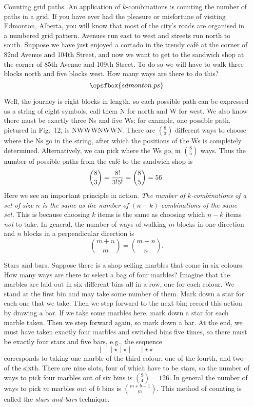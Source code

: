 \medskip\boldlabel Counting grid paths.
An application of $k$-combinations is counting the number of paths in a grid.
If you have ever had the pleasure or misfortune of visiting
Edmonton, Alberta, you will know that most of the city's roads
are organised in a numbered grid pattern. Avenues run east to west and streets run north to south.
Suppose we have just enjoyed a cortado in the trendy caf\'e
at the corner of 82nd Avenue and 104th Street,
and now we want to get to the sandwich shop at the corner of 85th Avenue and 109th Street.
To do so we will have to walk three blocks north and five blocks west. How many ways are there
to do this?
\midinsert
$$\epsfbox{edmonton.ps}$$
\vskip5pt
\caption{One possible path from the caf\'e to the sandwich shop.}
\endinsert
\goodbreak
Well, the journey is eight blocks in length, so each possible path can be expressed as
a string of eight symbols, call them {\mc N} for north and {\mc W} for west. We also know there
must be exactly three {\mc N}s and five {\mc W}s; for example, one possible path, pictured in
Fig.~12, is {\mc NWWWNWWN}. There are ${8\choose 3}$ different ways to choose where the {\mc N}s
go in the string, after which the positions of the {\mc W}s is completely determined. Alternatively,
we can pick where the {\mc W}s go, in ${8\choose 5}$ ways. Thus the number of possible paths
from the caf\'e to the sandwich shop is
$${8\choose 3} = {8!\over 3! 5!} = {8\choose 5} = 56.$$
Here we see an important principle in action. {\sl The number of $k$-combinations of a set
of size $n$ is the same as the number of $(n-k)$-combinations of the same set.}
This is because choosing $k$ items is
the same as choosing which $n-k$ items {\it not} to take.
In general, the number of ways of walking $m$ blocks in one direction and $n$ blocks in a perpendicular
direction is
$${m+n\choose m} = {m+n\choose n}.$$

\medskip\boldlabel Stars and bars.
Suppose there is a shop selling marbles that come in six colours. How many ways are there to select
a bag of four marbles? Imagine that the marbles are laid out in six different bins all in a row,
one for each colour. We stand at the first bin and may take some number of them. Mark down a
star for each one that we take. Then we step forward to the next bin; record this action by
drawing a bar. If we take some marbles here, mark down a star for each marble taken. Then we step forward
again, so mark down a bar. At the end, we must have taken exactly four marbles and switched bins
five times, so there must be exactly four stars and five bars, e.g., the sequence
$$\mid\quad\mid\star\mid\star\mid\quad\mid\star\star$$
corresponds to taking one marble of the third colour, one of the fourth, and two of the sixth.
There are nine slots, four of which have to be stars, so
the number of ways to pick four marbles out of six bins is ${9\choose 4} = 126$. In general
the number of ways to pick $m$ marbles out of $b$ bins is ${m+b-1\choose m}$. This method of
counting is called the {\it stars-and-bars} technique.

